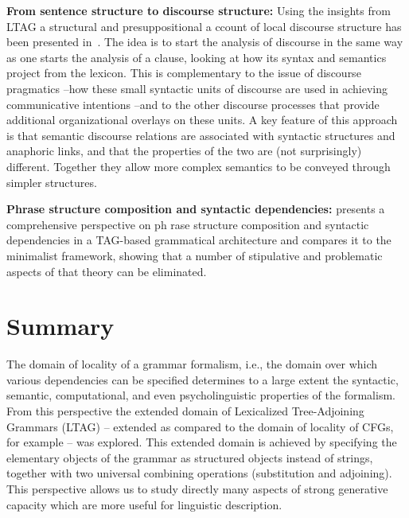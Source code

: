 {\bf From sentence structure to discourse structure:} Using the
insights from LTAG a structural and presuppositional a ccount of local
discourse structure has been presented
in~\cite{webber99:_discourse_tag}. The idea is to start the analysis
of discourse in the same way as one starts the analysis of a clause,
looking at how its syntax and semantics project from the lexicon. This
is complementary to the issue of discourse pragmatics --how these
small syntactic units of discourse are used in achieving communicative
intentions --and to the other discourse processes that provide
additional organizational overlays on these units. A key feature of
this approach is that semantic discourse relations are associated with
syntactic structures and anaphoric links, and that the properties of
the two are (not surprisingly) different. Together they allow more
complex semantics to be conveyed through simpler structures.

{\bf Phrase structure composition and syntactic dependencies:}
\cite{frank00:_tag_book} presents a comprehensive perspective on ph
rase structure composition and syntactic dependencies in a TAG-based
grammatical architecture and compares it to the minimalist framework,
showing that a number of stipulative and problematic aspects of that
theory can be eliminated.



\section{Summary}

The domain of locality of a grammar formalism, i.e., the domain over which
various dependencies can be specified determines to a large extent the
syntactic, semantic, computational, and even psycholinguistic properties of the
formalism. From this perspective the extended domain of Lexicalized
Tree-Adjoining Grammars (LTAG) -- extended as compared to the domain of locality
of CFGs, for example -- was explored. This extended domain is achieved by
specifying the elementary objects of the grammar as structured objects instead
of strings, together with two universal combining operations (substitution and
adjoining). This perspective allows us to study directly many aspects of strong
generative capacity which are more useful for linguistic description.  

